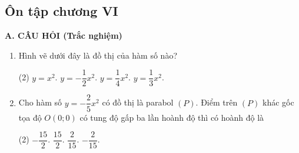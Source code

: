\begin{practice}
    \subsection{Ôn tập chương VI}

    \textbf{A. CÂU HỎI (Trắc nghiệm)}

    \begin{enumerate}
        \item Hình vẽ dưới đây là đồ thị của hàm số nào?

        \begin{center}
        \end{center}

        \begin{tasks}(2)
            \task[(A)] $y=x^2$.
            \task[(B)] $y=-\dfrac{1}{2}x^2$.
            \task[(C)] $y=\dfrac{1}{4}x^2$.
            \task[(D)] $y=\dfrac{1}{3}x^2$.
        \end{tasks}
        \par\noindent\answerbox\par

        \item Cho hàm số $y=-\dfrac{2}{5}x^2$ có đồ thị là parabol $(P)$. Điểm trên $(P)$ khác gốc tọa độ $O(0;0)$ có tung độ gấp ba lần hoành độ thì có hoành độ là
        \begin{tasks}(2)
            \task[(A)] $-\dfrac{15}{2}$.
            \task[(B)] $\dfrac{15}{2}$.
            \task[(C)] $\dfrac{2}{15}$.
            \task[(D)] $-\dfrac{2}{15}$.
        \end{tasks}
        \par\noindent\answerbox\par


\end{enumerate}
\end{practice}
